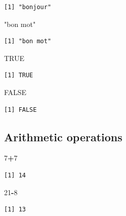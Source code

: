 \documentclass[]{book}
\newenvironment{Shaded}{\begin{snugshade}}{\end{snugshade}}
\newcommand{\DecValTok}[1]{\textcolor[rgb]{0.00,0.00,0.81}{#1}}
\newcommand{\StringTok}[1]{\textcolor[rgb]{0.31,0.60,0.02}{#1}}
\newcommand{\OtherTok}[1]{\textcolor[rgb]{0.56,0.35,0.01}{#1}}
\newcommand{\OperatorTok}[1]{\textcolor[rgb]{0.81,0.36,0.00}{\textbf{#1}}}
\theoremstyle{definition}
\theoremstyle{definition}
\theoremstyle{definition}
\theoremstyle{remark}
\begin{document}
\begin{verbatim}
[1] "bonjour"
\end{verbatim}

\begin{Shaded}
\begin{Highlighting}[]
\StringTok{"bon mot"}
\end{Highlighting}
\end{Shaded}

\begin{verbatim}
[1] "bon mot"
\end{verbatim}

\begin{Shaded}
\begin{Highlighting}[]
\OtherTok{TRUE}
\end{Highlighting}
\end{Shaded}

\begin{verbatim}
[1] TRUE
\end{verbatim}

\begin{Shaded}
\begin{Highlighting}[]
\OtherTok{FALSE}
\end{Highlighting}
\end{Shaded}

\begin{verbatim}
[1] FALSE
\end{verbatim}

\subsection{Arithmetic operations}\label{arithmetic-operations}

\begin{Shaded}
\begin{Highlighting}[]
\DecValTok{7}\OperatorTok{+}\DecValTok{7}
\end{Highlighting}
\end{Shaded}

\begin{verbatim}
[1] 14
\end{verbatim}

\begin{Shaded}
\begin{Highlighting}[]
\DecValTok{21}\OperatorTok{-}\DecValTok{8}
\end{Highlighting}
\end{Shaded}

\begin{verbatim}
[1] 13
\end{verbatim}
\end{document}
